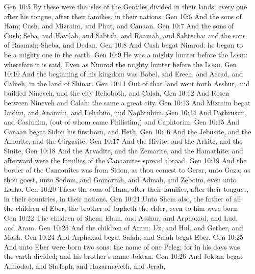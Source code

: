 \vs Gen 10:5 By these were the isles of the Gentiles divided in their lands; every one after his tongue, after their families, in their nations.
\vs Gen 10:6 And the sons of Ham; Cush, and Mizraim, and Phut, and Canaan.
\vs Gen 10:7 And the sons of Cush; Seba, and Havilah, and Sabtah, and Raamah, and Sabtecha: and the sons of Raamah; Sheba, and Dedan.
\vs Gen 10:8 And Cush begat Nimrod: he began to be a mighty one in the earth.
\vs Gen 10:9 He was a mighty hunter before the \textsc{Lord}: wherefore it is said, Even as Nimrod the mighty hunter before the \textsc{Lord}.
\vs Gen 10:10 And the beginning of his kingdom was Babel, and Erech, and Accad, and Calneh, in the land of Shinar.
\vs Gen 10:11 Out of that land went forth Asshur, and builded Nineveh, and the city Rehoboth, and Calah,
\vs Gen 10:12 And Resen between Nineveh and Calah: the same  a great city.
\vs Gen 10:13 And Mizraim begat Ludim, and Anamim, and Lehabim, and Naphtuhim,
\vs Gen 10:14 And Pathrusim, and Casluhim, (out of whom came Philistim,) and Caphtorim.
\vs Gen 10:15 And Canaan begat Sidon his firstborn, and Heth,
\vs Gen 10:16 And the Jebusite, and the Amorite, and the Girgasite,
\vs Gen 10:17 And the Hivite, and the Arkite, and the Sinite,
\vs Gen 10:18 And the Arvadite, and the Zemarite, and the Hamathite: and afterward were the families of the Canaanites spread abroad.
\vs Gen 10:19 And the border of the Canaanites was from Sidon, as thou comest to Gerar, unto Gaza; as thou goest, unto Sodom, and Gomorrah, and Admah, and Zeboim, even unto Lasha.
\vs Gen 10:20 These  the sons of Ham, after their families, after their tongues, in their countries,  in their nations.
\vs Gen 10:21 Unto Shem also, the father of all the children of Eber, the brother of Japheth the elder, even to him were  born.
\vs Gen 10:22 The children of Shem; Elam, and Asshur, and Arphaxad, and Lud, and Aram.
\vs Gen 10:23 And the children of Aram; Uz, and Hul, and Gether, and Mash.
\vs Gen 10:24 And Arphaxad begat Salah; and Salah begat Eber.
\vs Gen 10:25 And unto Eber were born two sons: the name of one  Peleg; for in his days was the earth divided; and his brother's name  Joktan.
\vs Gen 10:26 And Joktan begat Almodad, and Sheleph, and Hazarmaveth, and Jerah,
